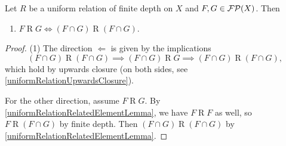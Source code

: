 \begin{lemma} \label{uniformRelationOfFiniteDepthLemma}
Let $R$ be a uniform relation of finite depth on $X$ and $F,G\in\operatorname{\mathcal{FP}}(X)$. Then
\begin{enumerate}
\item $F\mathrel{R} G \iff (F\cap G)\mathrel{R}(F\cap G)$.
\end{enumerate}
\end{lemma}
\begin{proof}
(1) The direction $\Leftarrow$ is given by the implications
\[ (F\cap G)\mathrel{R}(F\cap G) \implies (F\cap G)\mathrel{R}G \implies (F\cap G)\mathrel{R}(F\cap G), \]
which hold by upwards closure (on both sides, see \ref{uniformRelationUpwardsClosure}).

For the other direction, assume $F\mathrel{R} G$.
By \ref{uniformRelationRelatedElementLemma}, we have $F\mathrel{R} F$ as well, so $F\mathrel{R} (F\cap G)$ by finite depth. Then $(F\cap G)\mathrel{R}(F\cap G)$ by \ref{uniformRelationRelatedElementLemma}.
\end{proof}

